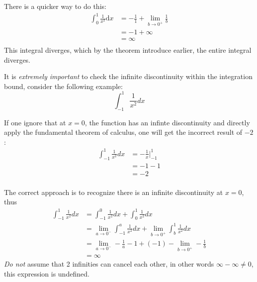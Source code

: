 \documentclass{article}
\begin{document}
There is a quicker way to do this:
\[
    \begin{split}
        \int_{0}^{1}\frac{1}{x^2}\mathrm{d}x & = -\frac{1}{1} + \lim_{b\to 0^+} \frac{1}{b} \\
        & = -1 + \infty \\
        & = \infty \\
    \end{split}
\]
This integral diverges, which by the theorem introduce earlier, the entire integral diverges.

It is \emph{extremely important} to check the infinite discontinuity within the integration bound, consider the following example:
\[
\int_{-1}^{1} \frac{1}{x^2}dx
\]

If one ignore that at $x=0$, the function has an infinte discontinuity and directly apply the fundamental theorem of calculus, one will get the incorrect result of $-2$:
\begin{align*}
    \int_{-1}^{1}\frac{1}{x^2}dx &= -\frac{1}{x} \Big|_{-1}^1\\
    &= -1 - 1 \\
    &= -2\\
\end{align*}

The correct approach is to recognize there is an infinite discontinuity at $x=0$, thus
\begin{align*}
    \int_{-1}^{1} \frac{1}{x^2}dx &= \int_{-1}^{0} \frac{1}{x^2} dx + \int_{0}^{1} \frac{1}{x^2}dx\\
    &= \lim_{a\to 0^-} \int_{-1}^{a} \frac{1}{x^2}dx + \lim_{b\to 0^+}\int_{b}^{1}\frac{1}{x^2}dx\\
    &= \lim_{a\to 0^-} -\frac{1}{a} - 1 + (-1) - \lim_{b\to 0^+} -\frac{1}{b}\\
    &= \infty
\end{align*}
\emph{Do not} assume that 2 infinities can cancel each other, in other words $\infty - \infty \neq 0$, this expression is undefined.

\newpage
\end{document}
